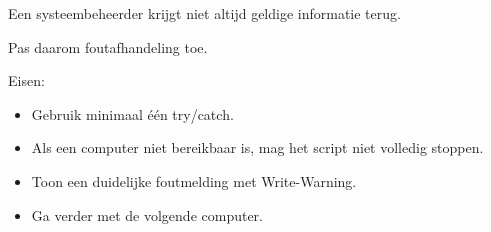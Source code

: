 Een systeembeheerder krijgt niet altijd geldige informatie terug.

Pas daarom foutafhandeling toe.

Eisen:
\begin{itemize}
\item Gebruik minimaal \'e\'en try/catch.
\item Als een computer niet bereikbaar is, mag het script niet volledig stoppen.
\item Toon een duidelijke foutmelding met Write-Warning.
\item Ga verder met de volgende computer.
\end{itemize}


